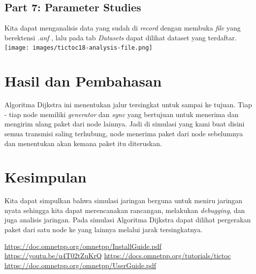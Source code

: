 \documentclass[conference]{IEEEtran}
\begin{document}
\subsection{Part 7: Parameter Studies}
Kita dapat menganalisis data yang sudah di \textit{record} dengan membuka \textit{file} yang berektensi \textit{.anf} , lalu pada tab \textit{Datasets} dapat dilihat dataset yang terdaftar.
\texttt{[image: images/tictoc18-analysis-file.png]}

\section{Hasil dan Pembahasan}
Algoritma Dijkstra ini menentukan jalur tersingkat untuk sampai ke tujuan. Tiap - tiap node memiliki \textit{generator} dan \textit{sync} yang bertujuan untuk menerima dan mengirim ulang paket dari node lainnya. Jadi di simulasi yang kami buat disini semua transmisi saling terhubung, node menerima paket dari node sebelumnya dan menentukan akan kemana paket itu diteruskan. 

\section{Kesimpulan}
Kita dapat simpulkan bahwa simulasi jaringan berguna untuk meniru jaringan nyata sehingga kita dapat merencanakan rancangan, melakukan \textit{debugging}, dan juga analisis jaringan. Pada simulasi Algoritma Dijkstra dapat dilihat pergerakan paket dari satu node ke yang lainnya melalui jarak tersingkatnya.


\begin{thebibliography}{1}
	\url{https://doc.omnetpp.org/omnetpp/InstallGuide.pdf}
	\url{https://youtu.be/u4T02tZuKrQ}
	\url{https://docs.omnetpp.org/tutorials/tictoc}
	\url{https://doc.omnetpp.org/omnetpp/UserGuide.pdf}
\end{thebibliography}
\end{document}
